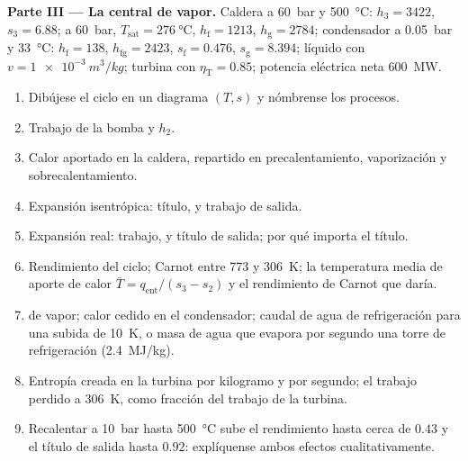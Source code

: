 \begin{problem}
\textbf{Parte III --- La central de vapor.}
Caldera a \qty{60}{bar} y \qty{500}{\celsius}: $h_3 = 3422$, $s_3 = 6.88$; a
\qty{60}{bar}, $T_{\text{sat}} = \qty{276}{\celsius}$, $h_{\text{f}} = 1213$,
$h_{\text{g}} = 2784$; condensador a \qty{0.05}{bar} y \qty{33}{\celsius}:
$h_{\text{f}} = 138$, $h_{\text{fg}} = 2423$, $s_{\text{f}} = 0.476$, $s_{\text{g}} =
8.394$; líquido con $v = \qty{1e-3}{m^3/kg}$; turbina con $\eta_{\text{T}} = 0.85$;
potencia eléctrica neta \qty{600}{MW}.
\begin{enumerate}[resume]
  \item Dibújese el ciclo en un diagrama $(T,s)$ y nómbrense los procesos.
  \item Trabajo de la bomba y $h_2$.
  \item Calor aportado en la caldera, repartido en precalentamiento, vaporización
        y sobrecalentamiento.
  \item Expansión isentrópica: título,  y trabajo de salida.
  \item Expansión real: trabajo,  y título de salida; por qué importa
        el título.
  \item Rendimiento del ciclo; Carnot entre \qty{773}{} y \qty{306}{K};
        la temperatura media de aporte de calor $\bar T = q_{\text{ent}}/(s_3
        - s_2)$ y el rendimiento de Carnot que daría.
  \item {} de vapor; calor cedido en el condensador; caudal de agua
        de refrigeración para una subida de \qty{10}{K}, o masa de agua que evapora
        por segundo una torre de refrigeración (\qty{2.4}{MJ/kg}).
  \item Entropía creada en la turbina por kilogramo y por segundo;
        el trabajo perdido a \qty{306}{K}, como fracción del trabajo de la
        turbina.
  \item Recalentar a \qty{10}{bar} hasta \qty{500}{\celsius} sube el
        rendimiento hasta cerca de $0.43$ y el título de salida hasta $0.92$:
        explíquense ambos efectos cualitativamente.
\end{enumerate}


\end{problem}
